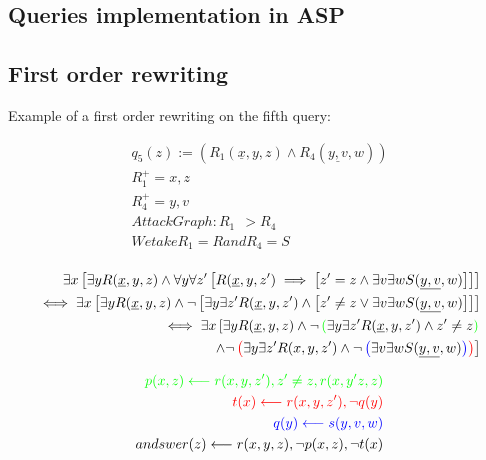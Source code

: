 \documentclass[acmsmall]{acmart}
\begin{document}
\begin{CCSXML}
\section{Queries implementation in ASP}

\subsection{First order rewriting}

Example of a first order rewriting on the fifth query:


\begin{align*}
	q_5(z)   :=  (R_1(\underline{x},y,z) \wedge R_4(\underline{y,v}, w))\\
	R_1^+ = x,z\\
	R_4^+ = y,v\\
	Attack Graph:  R_1 ~~> R_4\\
	We take R_1 = R and R_4 = S\\
\end{align*}



\begin{align*}
	\exists x \left[ \exists y R(\underline{x},y,z) \wedge \forall y \forall z' \left[ R(\underline{x},y,z') \implies \left[ z' = z \wedge \exists v \exists w S(\underline{y,v},w) \right] \right] \right]\\
	\iff \exists x \left[ \exists y R(\underline{x},y,z) \wedge \neg \left[ \exists y \exists z' R(\underline{x},y,z') \wedge \left[ z' \ne z  \lor \exists v \exists w S(\underline{y,v},w) \right] \right] \right]\\
	\iff \exists x \left[ \exists y R(\underline{x},y,z) \wedge \neg  \color{green}\left(\color{savedleftcolor}  \exists y \exists z' R(\underline{x},y,z') \land z' \ne z \color{green}\right) \right. \\
	 \left. \land \neg \color{red}\left(\color{savedleftcolor} \exists y \exists z' R(x,y,z') \land \neg \color{blue}\left(\color{savedleftcolor} \exists v \exists w S(\underline{y,v},w) \color{blue}\right) \color{red}\right)\color{savedleftcolor} \right] \\
\end{align*}

\begin{align*}
	\color{green}p(x,z) \longleftarrow r(x,y,z') , z' \ne z, r(x,y'z,z)\\
	\color{red}t(x) \longleftarrow r(x,y,z') , \neg q(y)\\
	\color{blue}q(y) \longleftarrow s(y,v,w)\\
	andswer(z) \longleftarrow r(x,y,z), \neg p(x,z), \neg t(x)\\
\end{align*}


\end{CCSXML}
\end{document}
